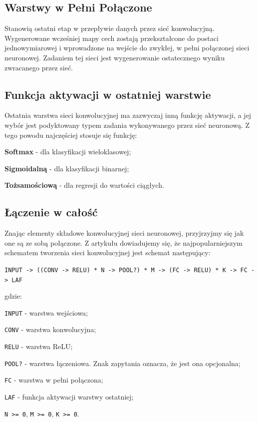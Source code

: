 \subsection{Warstwy w Pełni Połączone}
Stanowią ostatni etap w przepływie danych przez sieć konwolucyjną. Wygenerowane wcześniej mapy cech zostają przekształcone do postaci jednowymiarowej i wprowadzone na wejście do zwykłej, w pełni połączonej sieci neuronowej. Zadaniem tej sieci jest wygenerowanie ostatecznego wyniku zwracanego przez sieć.

\subsection{Funkcja aktywacji w ostatniej warstwie}
Ostatnia warstwa sieci konwolucyjnej ma zazwyczaj inną funkcję aktywacji, a jej wybór jest podyktowany typem zadania wykonywanego przez sieć neuronową. Z tego powodu najczęściej stosuje się funkcję:
\vspace{-0.3cm}
\begin{enumerate*}
\item \textbf{Softmax} \cite{wood:whatIsSoftmax} - dla klasyfikacji wieloklasowej;
\item \textbf{Sigmoidalną} \cite{saeed:sigmoidIntroduction} - dla klasyfikacji binarnej;
\item \textbf{Tożsamościową} - dla regresji do wartości ciągłych.
\end{enumerate*}

\subsection{Łączenie w całość}
Znając elementy składowe konwolucyjnej sieci neuronowej, przyjrzyjmy się jak one są ze sobą połączone. Z artykułu \cite{stanford:cnnCourse} dowiadujemy się, że najpopularniejszym schematem tworzenia sieci konwolucyjnej jest schemat następujący:

\noindent \texttt{INPUT -> ((CONV -> RELU) * N -> POOL?) * M -> (FC -> RELU) * K -> FC -> LAF}

\noindent gdzie:
\vspace{-0.5cm}
\begin{itemize*}
\item \texttt{INPUT} - warstwa wejściowa;
\item \texttt{CONV} - warstwa konwolucyjna;
\item \texttt{RELU} - warstwa ReLU;
\item \texttt{POOL?} - warstwa łączeniowa. Znak zapytania oznacza, że jest ona opcjonalna;
\item \texttt{FC} - warstwa w pełni połączona;
\item \texttt{LAF} - funkcja aktywacji warstwy ostatniej;
\item \texttt{N >= 0}, \texttt{M >= 0}, \texttt{K >= 0}.
\end{itemize*}

